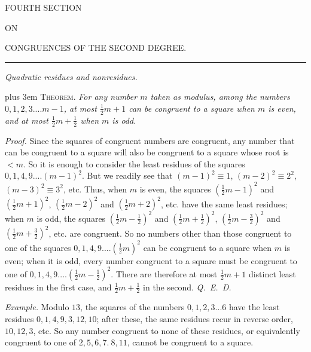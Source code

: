 \begin{center}
{\Large FOURTH SECTION}\par\bigskip
{\small ON}\par\bigskip
{\Large CONGRUENCES OF THE SECOND DEGREE.}
\end{center}

\begin{center}\rule{.09\linewidth}{.25pt}\end{center}

\begin{center}\small\emph{Quadratic residues and nonresidues.}\end{center}


{\rightskip=0pt plus 3em
\textsc{Theorem.} \emph{For any number $m$ taken as modulus, among the numbers \mbox{$0,1,2,3....m-1$}, at most $\tfrac12m+1$ can be congruent to a square when $m$ is even, and at most $\tfrac12m+\tfrac12$ when $m$ is odd.}\par}

\emph{Proof.} Since the squares of congruent numbers are congruent, any number that can be congruent to a square will also be congruent to a square whose root is $<m$. So it is enough to consider the least residues of the squares $0,1,4,9....(m-1)^2$. But we readily see that $(m-1)^2\equiv1$, $(m-2)^2\equiv2^2$, $(m-3)^2\equiv3^2$, etc. Thus, when $m$ is even, the squares $(\tfrac12m-1)^2$ and $(\tfrac12m+1)^2$, $(\tfrac12m-2)^2$ and $(\tfrac12m+2)^2$, etc. have the same least residues; when $m$ is odd, the squares $(\tfrac12m-\tfrac12)^2$ and $(\tfrac12m+\tfrac12)^2$, $(\tfrac12m-\tfrac32)^2$ and $(\tfrac12m+\tfrac32)^2$, etc. are congruent. So no numbers other than those congruent to one of the squares $0,1,4,9....(\tfrac12m)^2$ can be congruent to a square when $m$ is even; when it is odd, every number congruent to a square must be congruent to one of $0,1,4,9....(\tfrac12m-\tfrac12)^2$. There are therefore at most $\tfrac12m+1$ distinct least residues in the first case, and $\tfrac12m+\tfrac12$ in the second. \mbox{\emph{Q. E. D.}}

\emph{Example.} Modulo $13$, the squares of the numbers $0,1,2,3...6$ have the least residues $0,1,4,9,3,12,10$; after these, the same residues recur in reverse order, $10,12,3$, etc. So any number congruent to none of these residues, or equivalently congruent to one of $2,5,6,7.\ 8,11$, cannot be congruent to a square.

